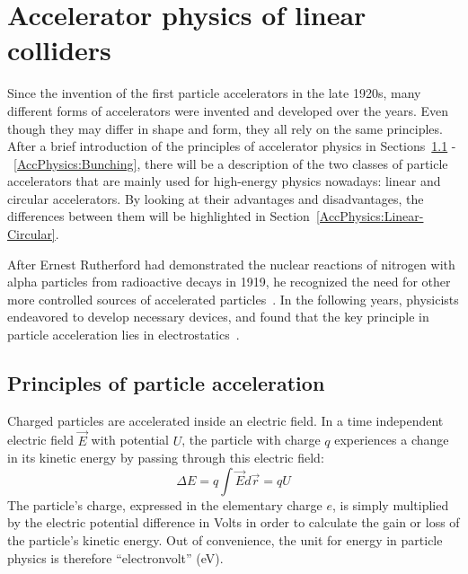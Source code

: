 \chapter{Accelerator physics of linear colliders}
\label{LinearColliderPhysics}

\begin{chapterabstract}
Since the invention of the first particle accelerators in the late 1920s, many different forms of accelerators were invented and developed over the years. 
Even though they may differ in shape and form, they all rely on the same principles. 
After a brief introduction of the principles of accelerator physics in Sections~\ref{AccPhysics:Principles} -~\ref{AccPhysics:Bunching}, there will be a description of the two classes of particle accelerators that are mainly used for high-energy physics nowadays: linear and circular accelerators. 
By looking at their advantages and disadvantages, the differences between them will be highlighted in Section~\ref{AccPhysics:Linear-Circular}.
\end{chapterabstract}
\vspace*{0.5cm}\newline 
\noindent
After Ernest Rutherford had demonstrated the nuclear reactions of nitrogen with alpha particles from radioactive decays in 1919, he recognized the need for other more controlled sources of accelerated particles~\cite{Rutherford}.
In the following years, physicists endeavored to develop necessary devices, and found that the key principle in particle acceleration lies in electrostatics~\cite[p. 3f]{Livingston}.

\section{Principles of particle acceleration}
\label{AccPhysics:Principles}
Charged particles are accelerated inside an electric field. 
In a time independent electric field $\vec{E}$ with potential $U$, the particle with charge $q$ experiences a change in its kinetic energy by passing through this electric field:
\begin{equation}
 \Delta E = q \int \vec{E}d\vec{r} = qU
\end{equation}
The particle's charge, expressed in the elementary charge $e$, is simply multiplied by the electric potential difference in Volts in order to calculate the gain or loss of the particle's kinetic energy. 
Out of convenience, the unit for energy in particle physics is therefore ``electronvolt'' (eV).

